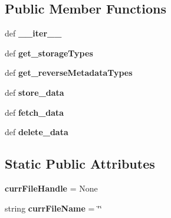 \subsection*{Public Member Functions}
\begin{DoxyCompactItemize}
\item 
\hypertarget{classcheshire3_1_1base_store_1_1_file_system_store_acea3aac4b2ee7f92a17d797d766226a7}{def {\bfseries \-\_\-\-\_\-iter\-\_\-\-\_\-}}\label{classcheshire3_1_1base_store_1_1_file_system_store_acea3aac4b2ee7f92a17d797d766226a7}

\item 
\hypertarget{classcheshire3_1_1base_store_1_1_file_system_store_a9b334f818dd40dc8861819b375bd695f}{def {\bfseries get\-\_\-storage\-Types}}\label{classcheshire3_1_1base_store_1_1_file_system_store_a9b334f818dd40dc8861819b375bd695f}

\item 
\hypertarget{classcheshire3_1_1base_store_1_1_file_system_store_ab4770f66a70b600a2fd4f500448902ab}{def {\bfseries get\-\_\-reverse\-Metadata\-Types}}\label{classcheshire3_1_1base_store_1_1_file_system_store_ab4770f66a70b600a2fd4f500448902ab}

\item 
\hypertarget{classcheshire3_1_1base_store_1_1_file_system_store_ae3efa3bebd41f4cf3783542e8998cd10}{def {\bfseries store\-\_\-data}}\label{classcheshire3_1_1base_store_1_1_file_system_store_ae3efa3bebd41f4cf3783542e8998cd10}

\item 
\hypertarget{classcheshire3_1_1base_store_1_1_file_system_store_afa983fc0290087aacdd2a377c8a3b537}{def {\bfseries fetch\-\_\-data}}\label{classcheshire3_1_1base_store_1_1_file_system_store_afa983fc0290087aacdd2a377c8a3b537}

\item 
\hypertarget{classcheshire3_1_1base_store_1_1_file_system_store_a2f5c66836253898ad30e43f80becb823}{def {\bfseries delete\-\_\-data}}\label{classcheshire3_1_1base_store_1_1_file_system_store_a2f5c66836253898ad30e43f80becb823}

\end{DoxyCompactItemize}
\subsection*{Static Public Attributes}
\begin{DoxyCompactItemize}
\item 
\hypertarget{classcheshire3_1_1base_store_1_1_file_system_store_a5d09dec91c396006daf0edf5e10ad03d}{{\bfseries curr\-File\-Handle} = None}\label{classcheshire3_1_1base_store_1_1_file_system_store_a5d09dec91c396006daf0edf5e10ad03d}

\item 
\hypertarget{classcheshire3_1_1base_store_1_1_file_system_store_a143d4c58f514ac2dd61d7f05c90266e2}{string {\bfseries curr\-File\-Name} = \char`\"{}\char`\"{}}\label{classcheshire3_1_1base_store_1_1_file_system_store_a143d4c58f514ac2dd61d7f05c90266e2}

\end{DoxyCompactItemize}
